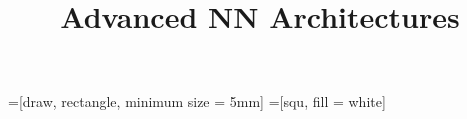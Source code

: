 



=[draw, rectangle, minimum size = 5mm]
=[squ, fill = white]

\newcommand{\learninggoals}{
\item Understand attention mechanism
\item Learn the different types of attention}

\title{Advanced NN Architectures}
\date{}




